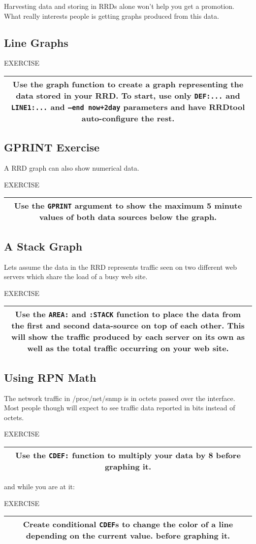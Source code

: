 \documentclass[a4paper,12pt]{article}
\newenvironment{work}{\textsf{\tiny EXERCISE}\nopagebreak\\[0.3ex]\begin{tabular}{|c|}
 \hline
 \begin{minipage}{0.965\linewidth}%
 \setlength{\parskip}{1.6ex plus 0.6ex minus 0.4ex}%
 \rule{0pt}{2.8ex}\ignorespaces}
{\rule[-1.8ex]{0pt}{0pt}\end{minipage}\\
 \hline
 \end{tabular}}
\newcommand{\ex}[1]{\subsection{#1}}
\newcommand{\cmd}[1]{\texttt{\mbox{#1}}}
\begin{document}
Harvesting data and storing in RRDs alone won't help you get a
promotion. What really interests people is getting graphs produced from
this data.

\ex{Line Graphs}


\begin{work}
Use the graph function to create a graph representing the data
stored in your RRD. To start, use only \cmd{DEF:...} and \cmd{LINE1:...}
and \cmd{--end now+2day} parameters and have RRDtool
auto-configure the rest. 
\end{work}

\ex{GPRINT Exercise}
A RRD graph can also show numerical data.

\begin{work}
  Use the \cmd{GPRINT} argument to show the maximum 5 minute values of
  both data sources below the graph.
\end{work}

\ex{A Stack Graph}
Lets assume the data in the RRD represents traffic seen on two
different web servers which share the load of a busy web site.

\begin{work}
  Use the \cmd{AREA:} and \cmd{:STACK} function to place the data from
  the first and second data-source on top of each other. This will
  show the traffic produced by each server on its own as well as the
  total traffic occurring on your web site.
\end{work}

\ex{Using RPN Math}

The network traffic in /proc/net/snmp is in octets passed over the
interface. Most people though will expect to see traffic data reported in
bits instead of octets.

\begin{work}
Use the \cmd{CDEF:} function to multiply your data by 8
before graphing it.
\end{work}

and while you are at it:

\begin{work}
Create  conditional \cmd{CDEF}s to change the color of a line depending on the current value.
before graphing it.
\end{work}
\end{document}
